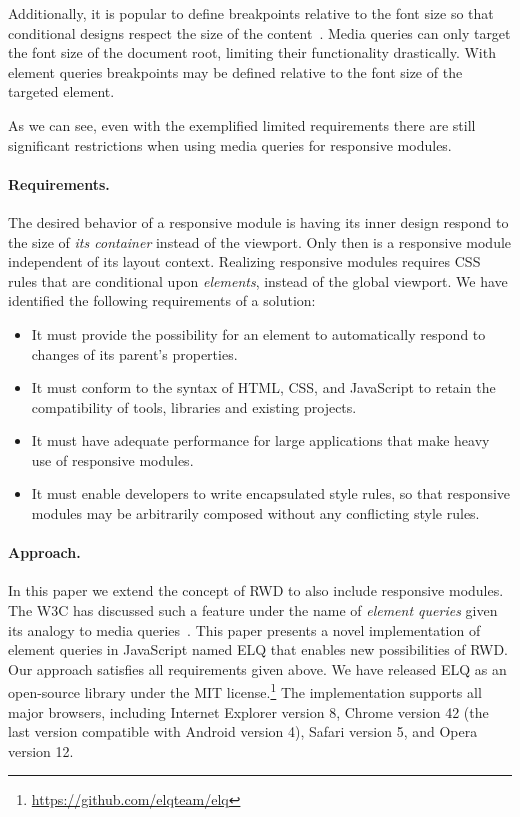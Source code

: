 \documentclass[]{llncs}
\newcommand{\elq}{ELQ}
\begin{document}
    Additionally, it is popular to define breakpoints relative to the font size so that conditional designs respect the size of the content~\cite{mq-em}.
    Media queries can only target the font size of the document root, limiting their functionality drastically.
    With element queries breakpoints may be defined relative to the font size of the targeted element.

    As we can see, even with the exemplified limited requirements there are still significant restrictions when using media queries for responsive modules.

  \paragraph{Requirements.}\label{sec:reqs}
    The desired behavior of a responsive module is having its inner design respond to the size of \emph{its container} instead of the viewport.
    Only then is a responsive module independent of its layout context.
    Realizing responsive modules requires CSS rules that are conditional upon \emph{elements}, instead of the global viewport.
    We have identified the following requirements of a solution:

    \begin{itemize}
      \item
        It must provide the possibility for an element to automatically respond to changes of its parent's properties.
      \item
        It must conform to the syntax of HTML, CSS, and JavaScript to retain the compatibility of tools, libraries and existing projects.
      \item
        It must have adequate performance for large applications that make heavy use of responsive modules.
      \item
        It must enable developers to write encapsulated style rules, so that responsive modules may be arbitrarily composed without any conflicting style rules.
    \end{itemize}
  \paragraph{Approach.}
    In this paper we extend the concept of RWD to also include responsive modules.
    The W3C has discussed such a feature under the name of \emph{element queries} given its analogy to media queries~\cite{w3c_eq_mail}.
    This paper presents a novel implementation of element queries in JavaScript named \elq{} that enables new possibilities of RWD.
    Our approach satisfies all requirements given above.
    We have released ELQ as an open-source library under the MIT license.\footnote{\url{https://github.com/elqteam/elq}}
    The implementation supports all major browsers, including Internet Explorer version 8, Chrome version 42 (the last version compatible with Android version 4), Safari version 5, and Opera version 12.
\end{document}
